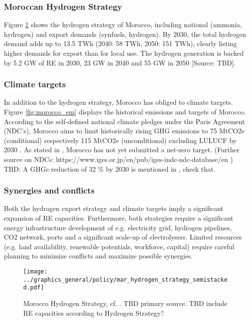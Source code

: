 \subsubsection{Moroccan Hydrogen Strategy}
Figure \ref{fig:mar_hydrogen_strategy} shows the hydrogen strategy of Morocco, including
national (ammonia, hydrogen) and export demands (synfuels, hydrogen).
By 2030, the total hydrogen demand adds up to 13.5 TWh (2040: 58 TWh, 2050: 151 TWh), 
clearly listing higher demands for export than for local use. The hydrogen generation is backed by 5.2 GW of RE in 2030, 23 GW in 2040 and 55 GW in 2050 [Source: TBD].

\subsubsection{Climate targets}
In addition to the hydrogen strategy, Morocco has obliged to climate targets.
Figure \ref{fig:morocco_em} displays the historical emissions and targets of Morocco.
According to the self-defined national climate pledges under the Paris Agreement (NDC's), Morocco aims to limit historically rising GHG emissions to 75 MtCO2e (conditional) respectively 115 MtCO2e (unconditional) excluding LULUCF by 2030 \cite{CAT2021}. 
As stated in \cite{CAT2021}, Morocco has not yet submitted a net-zero target. (Further source on NDCs: https://www.iges.or.jp/en/pub/iges-indc-ndc-database/en )
TBD: A GHGe reduction of 32 \% by 2030 is mentioned in \cite[5]{Boulakhbar2020}, check that.

\subsubsection{Synergies and conflicts}
Both the hydrogen export strategy and climate targets imply a significant expansion of RE capacities. Furthermore, both strategies require a significant energy infrastructure development of e.g. electricity grid, hydrogen pipelines, CO2 network, ports and a significant scale-up of electrolysers.
Limited resources (e.g. land availability, renewable potentials, workforce, capital) require careful planning to minimize conflicts and maximize possible synergies.



\begin{figure}
    \centering
    \texttt{[image: ../graphics\_general/policy/mar\_hydrogen\_strategy\_semistacked.pdf]}
    \caption{Morocco Hydrogen Strategy, cf. \cite[p. 14]{Ersoy2022}. TBD primary source. TBD include RE capacities according to Hydrogen Strategy?}
    \label{fig:mar_hydrogen_strategy}
\end{figure}





